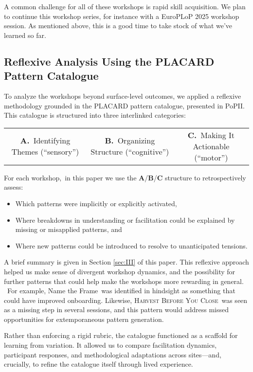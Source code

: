 \documentclass[acmlarge,timestamp]{acmart}
\providecommand{\tightlist}{%
  \setlength{\itemsep}{0pt}\setlength{\parskip}{0pt}}
\begin{document}
A common challenge for all of these workshops is rapid skill
acquisition.  We plan to continue this workshop series, for instance
with a EuroPLoP 2025 workshop session.  As mentioned above, this is
a good time to take stock of what we’ve learned so far.

\subsection{Reflexive Analysis Using the PLACARD Pattern Catalogue}

To analyze the workshops beyond surface-level outcomes, we applied a
reflexive methodology grounded in the PLACARD pattern catalogue,
presented in PoPII.  This catalogue is structured into three
interlinked categories:

\medskip
\hspace{-.5cm}\begin{tabular}{ccc}
\textbf{A.}~Identifying Themes (“sensory”)&
\textbf{B.}~Organizing Structure (“cognitive”)&
\textbf{C.}~Making It Actionable (“motor”)\\
\end{tabular}

\vspace{.2cm}
For each workshop,~in this paper we use the
\textbf{A}/\textbf{B}/\textbf{C} structure to retrospectively
assess:

\begin{itemize}
\tightlist
\item Which patterns were implicitly or explicitly activated,
\item Where breakdowns in understanding or facilitation could be explained by missing or misapplied patterns, and
\item Where new patterns could be introduced to resolve to unanticipated tensions.
\end{itemize}

A brief summary is given in Section \ref{sec:III} of this paper.  This
reflexive approach helped us make sense of divergent workshop
dynamics, and the possibility for further patterns that could help
make the workshops more rewarding in general. ~For example, Name the
Frame~was identified in hindsight as something that could have
improved onboarding. Likewise, {\scshape {Harvest Before You
    Close}}~was seen as a missing step in several sessions, and this
pattern would address missed opportunities for extemporaneous pattern
generation.

Rather than enforcing a rigid rubric, the catalogue functioned as a
scaffold for learning from variation. It allowed us to compare
facilitation dynamics, participant responses, and methodological
adaptations across sites---and, crucially, to refine the catalogue
itself through lived experience.
\end{document}
